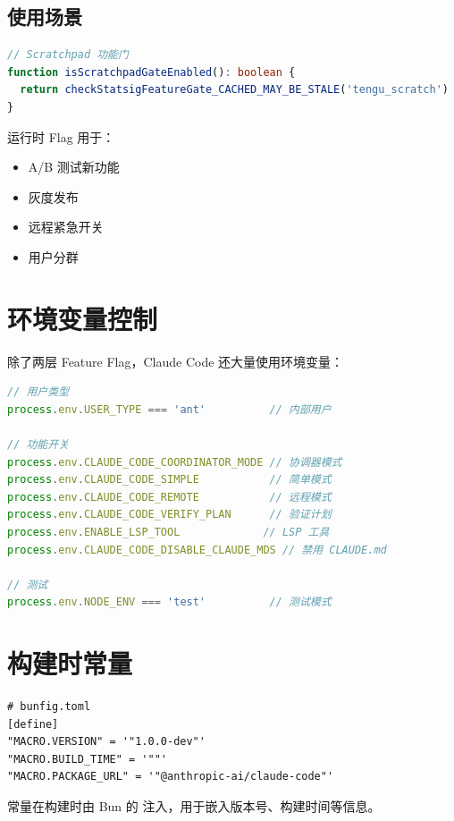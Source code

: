 \subsection{使用场景}

\begin{lstlisting}[language=TypeScript,breaklines=true]
// Scratchpad 功能门
function isScratchpadGateEnabled(): boolean {
  return checkStatsigFeatureGate_CACHED_MAY_BE_STALE('tengu_scratch')
}
\end{lstlisting}

运行时 Flag 用于：
\begin{itemize}[nosep]
  \item A/B 测试新功能
  \item 灰度发布
  \item 远程紧急开关
  \item 用户分群
\end{itemize}

\section{环境变量控制}

除了两层 Feature Flag，Claude Code 还大量使用环境变量：

\begin{lstlisting}[language=TypeScript,breaklines=true]
// 用户类型
process.env.USER_TYPE === 'ant'          // 内部用户

// 功能开关
process.env.CLAUDE_CODE_COORDINATOR_MODE // 协调器模式
process.env.CLAUDE_CODE_SIMPLE           // 简单模式
process.env.CLAUDE_CODE_REMOTE           // 远程模式
process.env.CLAUDE_CODE_VERIFY_PLAN      // 验证计划
process.env.ENABLE_LSP_TOOL             // LSP 工具
process.env.CLAUDE_CODE_DISABLE_CLAUDE_MDS // 禁用 CLAUDE.md

// 测试
process.env.NODE_ENV === 'test'          // 测试模式
\end{lstlisting}

\section{构建时常量}

\begin{lstlisting}[breaklines=true]
# bunfig.toml
[define]
"MACRO.VERSION" = '"1.0.0-dev"'
"MACRO.BUILD_TIME" = '""'
"MACRO.PACKAGE_URL" = '"@anthropic-ai/claude-code"'
\end{lstlisting}

 常量在构建时由 Bun 的  注入，用于嵌入版本号、构建时间等信息。

